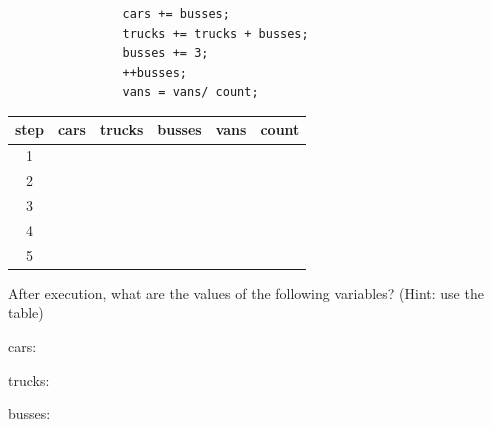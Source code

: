 \documentclass[letterpaper,12pt]{article}
\begin{document}
\begin{enumerate}
\begin{lstlisting}
                cars += busses;
                trucks += trucks + busses;
                busses += 3;
                ++busses;
                vans = vans/ count;
            \end{lstlisting}
            \begin{table}[h!]
            \begin{center}
                \begin{tabular}{|c|c|c|c|c|c|}
                    \hline
                    step & cars & trucks & busses & vans & count \\ \hline
                    1 & & & & & \\ \hline
                    2 & & & & & \\ \hline
                    3 & & & & & \\ \hline
                    4 & & & & & \\ \hline
                    5 & & & & & \\ \hline
                \end{tabular}
            \end{center}
            \end{table}
            After execution, what are the values of the following variables? (Hint: use the table)

            cars:

            trucks:

            busses:


\end{enumerate}
\end{document}
